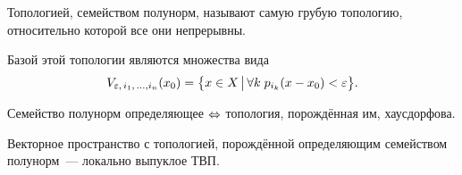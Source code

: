 \documentclass{notes}
\begin{document}
	\begin{de}
		Топологией,  семейством полунорм, называют самую грубую топологию, относительно которой все они непрерывны. 
	\end{de}

	\begin{st}
		Базой этой топологии являются множества вида
		\[
			V_{\varepsilon, \, i_1, \,  \ldots, i_n}(x_0) = \big\{x \in X \, \big| \, \forall k \; p_{i_k}(x - x_0) < \varepsilon \big\}.
		\]
	\end{st}

	\begin{st}
		Семейство полунорм определяющее $\Leftrightarrow$ топология, порождённая им, хаусдорфова.
	\end{st}

	\begin{st}
		Векторное пространство с топологией, порождённой определяющим семейством полунорм~--- локально выпуклое ТВП.
	\end{st}
\end{document}
